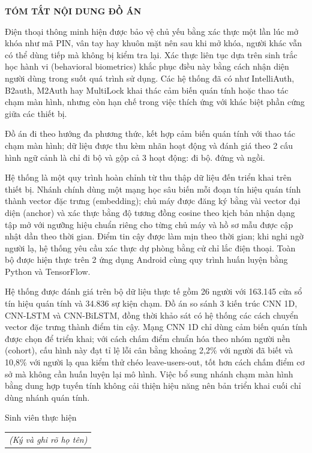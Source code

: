 \documentclass[../DoAn.tex]{subfiles}
\begin{document}
\begin{center}
    \Large{\textbf{TÓM TẮT NỘI DUNG ĐỒ ÁN}}\\
\end{center}
\vspace{1cm}
Điện thoại thông minh hiện được bảo vệ chủ yếu bằng xác thực một lần lúc mở khóa như mã PIN, vân tay hay khuôn mặt nên sau khi mở khóa, người khác vẫn có thể dùng tiếp mà không bị kiểm tra lại. Xác thực liên tục dựa trên sinh trắc học hành vi (behavioral biometrics) khắc phục điều này bằng cách nhận diện người dùng trong suốt quá trình sử dụng. Các hệ thống đã có như IntelliAuth, B2auth, M2Auth hay MultiLock khai thác cảm biến quán tính hoặc thao tác chạm màn hình, nhưng còn hạn chế trong việc thích ứng với khác biệt phần cứng giữa các thiết bị.

Đồ án đi theo hướng đa phương thức, kết hợp cảm biến quán tính với thao tác chạm màn hình; dữ liệu được thu kèm nhãn hoạt động và đánh giá theo 2 cấu hình ngữ cảnh là chỉ đi bộ và gộp cả 3 hoạt động: đi bộ. đứng và ngồi.

Hệ thống là một quy trình hoàn chỉnh từ thu thập dữ liệu đến triển khai trên thiết bị. Nhánh chính dùng một mạng học sâu biến mỗi đoạn tín hiệu quán tính thành vector đặc trưng (embedding); chủ máy được đăng ký bằng vài vector đại diện (anchor) và xác thực bằng độ tương đồng cosine theo kịch bản nhận dạng tập mở với ngưỡng hiệu chuẩn riêng cho từng chủ máy và hồ sơ mẫu được cập nhật dần theo thời gian. Điểm tin cậy được làm mịn theo thời gian; khi nghi ngờ người lạ, hệ thống yêu cầu xác thực dự phòng bằng cử chỉ lắc điện thoại. Toàn bộ được hiện thực trên 2 ứng dụng Android cùng quy trình huấn luyện bằng Python và TensorFlow.

Hệ thống được đánh giá trên bộ dữ liệu thực tế gồm 26 người với 163.145 cửa sổ tín hiệu quán tính và 34.836 sự kiện chạm. Đồ án so sánh 3 kiến trúc CNN 1D, CNN-LSTM và CNN-BiLSTM, đồng thời khảo sát có hệ thống các cách chuyển vector đặc trưng thành điểm tin cậy. Mạng CNN 1D chỉ dùng cảm biến quán tính được chọn để triển khai; với cách chấm điểm chuẩn hóa theo nhóm người nền (cohort), cấu hình này đạt tỉ lệ lỗi cân bằng khoảng 2,2\% với người đã biết và 10,8\% với người lạ qua kiểm thử chéo leave-users-out, tốt hơn cách chấm điểm cơ sở mà không cần huấn luyện lại mô hình. Việc bổ sung nhánh chạm màn hình bằng dung hợp tuyến tính không cải thiện hiệu năng nên bản triển khai cuối chỉ dùng nhánh quán tính.
\begin{flushright}
Sinh viên thực hiện\\
\begin{tabular}{@{}c@{}}
\textit{(Ký và ghi rõ họ tên)}
\end{tabular}
\end{flushright}
\end{document}
